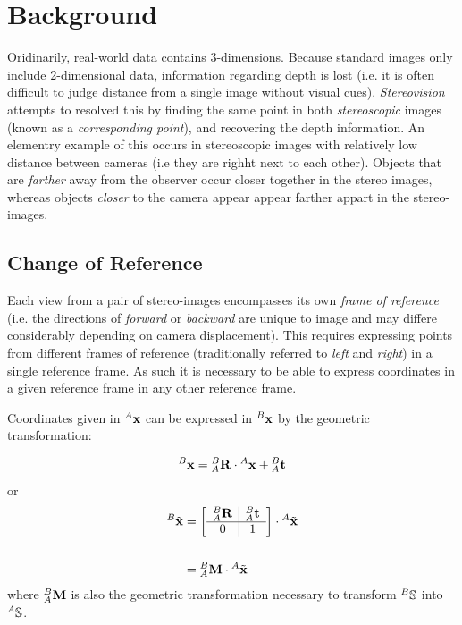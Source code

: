 \chapter{Background}

\par Oridinarily, real-world data contains 3-dimensions. 
Because standard images only include 2-dimensional data, information regarding depth is lost (i.e. it is often difficult to judge distance from a single image without visual cues). 
\textit{Stereovision} attempts to resolved this by finding the same point in both \textit{stereoscopic} images (known as a \textit{corresponding point}), and recovering the depth information.
An elementry example of this occurs in stereoscopic images with relatively low distance between cameras (i.e they are righht next to each other). 
Objects that are \textit{farther} away from the observer occur closer together in the stereo images, whereas objects \textit{closer} to the camera appear appear farther appart in the stereo-images.

\section{Change of Reference}

\par Each view from a pair of stereo-images encompasses its own \textit{frame of reference} (i.e. the directions of \textit{forward} or \textit{backward} are unique to image and may differe considerably depending on camera displacement).
This requires expressing points from different frames of reference (traditionally referred to \textit{left} and \textit{right}) in a single reference frame. 
As such it is necessary to be able to express coordinates in a given reference frame in any other reference frame.

\par Coordinates given in ${^{A}\mathbf{x}}$ can be expressed in ${^{B}\mathbf{x}}$ by the geometric transformation:
\par
\begin{align*}
	{\ensuremath{^{B}}\mathbf{x}} = {^{B}_{A}}\mathbf{R} \cdot {\ensuremath{^{A}}\mathbf{x}} + {^{B}_{A}}\mathbf{t}
\end{align*}
or
\begin{align*}
	{\ensuremath{^{B}}\tilde{\mathbf{x}}} &=
	\left[\begin{array}{c|c}
		{\ensuremath{^{B}}\ensuremath{_{A}}}\textbf{R} & {^{B}_{A}}\textbf{t} \\\hline
		0 & 1 \\
	\end{array}\right]
	\cdot{\ensuremath{^{A}}\tilde{\mathbf{x}}} \\
	&\\
	&= {^{B}_{A}}\mathbf{M}\cdot{\ensuremath{^{A}}\tilde{\mathbf{x}}}\\
\end{align*}
where ${^{B}_{A}}\mathbf{M}$ is also the geometric transformation necessary to transform $^{B}\mathbb{S}$ into $^{A}\mathbb{S}$. 

